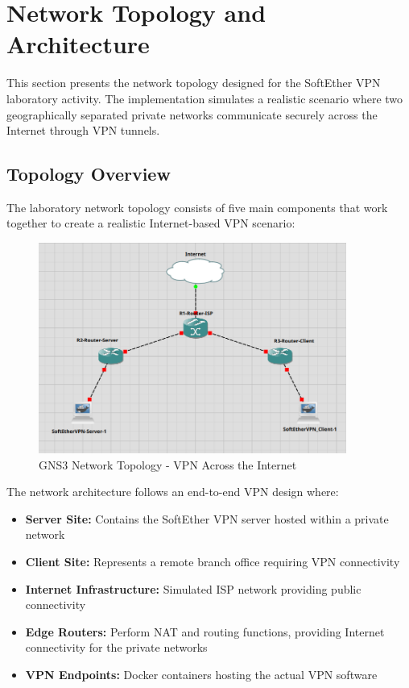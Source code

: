 \newpage

\section{Network Topology and Architecture}

This section presents the network topology designed for the SoftEther VPN laboratory activity. The implementation simulates a realistic scenario where two geographically separated private networks communicate securely across the Internet through VPN tunnels. 

\subsection{Topology Overview}

The laboratory network topology consists of five main components that work together to create a realistic Internet-based VPN scenario:

\begin{figure}[H]
\centering
\includegraphics[width=0.9\textwidth]{../resources/Images/GNS3_Structure.png}
\caption{GNS3 Network Topology - VPN Across the Internet}
\label{fig:gns3_topology}
\end{figure}

The network architecture follows an end-to-end VPN design where:

\begin{itemize}
    \item \textbf{Server Site:} Contains the SoftEther VPN server hosted within a private network
    \item \textbf{Client Site:} Represents a remote branch office requiring VPN connectivity
    \item \textbf{Internet Infrastructure:} Simulated ISP network providing public connectivity
    \item \textbf{Edge Routers:} Perform NAT and routing functions, providing Internet connectivity for the private networks
    \item \textbf{VPN Endpoints:} Docker containers hosting the actual VPN software 
\end{itemize}

